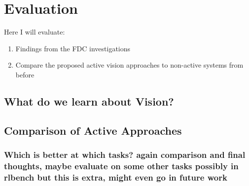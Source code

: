 \chapter{Evaluation}
Here I will evaluate:
\begin{enumerate}
  \item Findings from the FDC investigations
  \item Compare the proposed active vision approaches to non-active systems from before
\end{enumerate}

\section{What do we learn about Vision?}

\section{Comparison of Active Approaches}

\subsection{Which is better at which tasks? again comparison and final thoughts, maybe evaluate on some other tasks possibly in rlbench but this is extra, might even go in future work}
